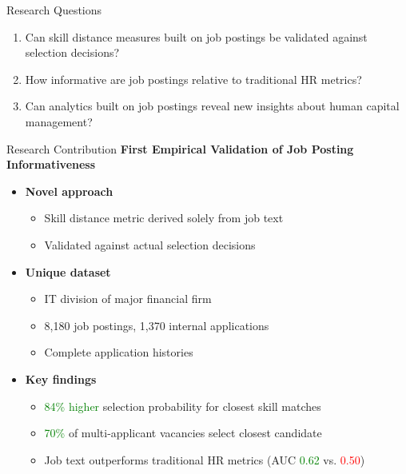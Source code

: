 \documentclass{beamer}
\begin{document}
\begin{frame}{Research Questions}
\begin{enumerate}
    \item Can skill distance measures built on job postings be validated against selection decisions?
    \item How informative are job postings relative to traditional HR metrics?
    \item Can analytics built on job postings reveal new insights about human capital management?
\end{enumerate}
\end{frame}

\begin{frame}{Research Contribution}
\textbf{First Empirical Validation of Job Posting Informativeness}
\begin{itemize}
    \item \textbf{Novel approach}
    \begin{itemize}
        \item Skill distance metric derived solely from job text
        \item Validated against actual selection decisions
    \end{itemize}
    \item \textbf{Unique dataset}
    \begin{itemize}
        \item IT division of major financial firm
        \item 8,180 job postings, 1,370 internal applications
        \item Complete application histories
    \end{itemize}
    \item \textbf{Key findings}
    \begin{itemize}
        \item \textcolor{green}{84\% higher} selection probability for closest skill matches
        \item \textcolor{green}{70\%} of multi-applicant vacancies select closest candidate
        \item Job text outperforms traditional HR metrics (AUC \textcolor{green}{0.62} vs. \textcolor{red}{0.50})
    \end{itemize}
\end{itemize}
\end{frame}
\end{document}

